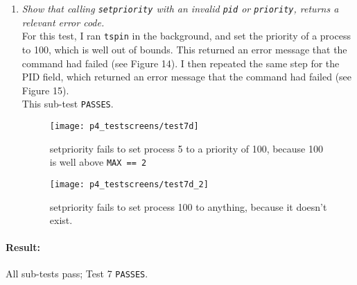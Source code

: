 \documentclass[11pt,letterpaper]{report}
\begin{document}
\begin{enumerate}
		\item \emph{Show that calling {\tt setpriority} with an invalid {\tt pid} or {\tt priority}, returns a relevant error code.}\\
		For this test, I ran {\tt tspin} in the background, and set the priority of a process to 100, which is well out of bounds. This returned an error message that the command had failed (see {\color{red} Figure 14}). I then repeated the same step for the PID field, which returned an error message that the command had failed (see {\color{red} Figure 15}).\\
		This sub-test {\tt PASSES}.
		\begin{figure}
			\centering
			\texttt{[image: p4\_testscreens/test7d]}
			\caption{setpriority fails to set process 5 to a priority of 100, because 100 is well above {\tt MAX == 2}}
			\label{fig:test7d}
		\end{figure}
		\begin{figure}
			\centering
			\texttt{[image: p4\_testscreens/test7d\_2]}
			\caption{setpriority fails to set process 100 to anything, because it doesn't exist.}
			\label{fig:test7d2}
		\end{figure}
	\end{enumerate}
	\paragraph{Result:}All sub-tests pass; Test 7 {\tt PASSES}.
\end{document}
